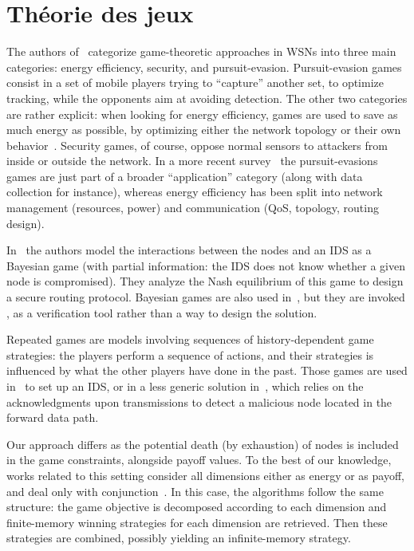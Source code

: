 \section{Théorie des jeux}

The authors of~\cite{MT08} categorize game-theoretic approaches in WSNs into three main categories: energy efficiency, security, and pursuit-evasion.
Pursuit-evasion games consist in a set of mobile players trying to “capture” another set, to optimize tracking, while the opponents aim at avoiding detection.
The other two categories are rather explicit: when looking for energy efficiency, games are used to save as much energy as possible, by optimizing either the network topology or their own behavior~\cite{CPF09}.
Security games, of course, oppose normal sensors to attackers from inside or outside the network.
In a more recent survey~\cite{SWKC12} the pursuit-evasions games are just part of a broader “application” category (along with data collection for instance), whereas energy efficiency has been split into network management (resources, power) and communication (QoS, topology, routing design).

In~\cite{MMZ09} the authors model the interactions between the nodes and an IDS as a Bayesian game (\ie with partial information: the IDS does not know \apriori whether a given node is compromised).
They analyze the Nash equilibrium of this game to design a secure routing protocol.
Bayesian games are also used in~\cite{Ham12}, but they are invoked \aposteriori, as a verification tool rather than a way to design the solution.

Repeated games are models involving sequences of history-dependent game strategies: the players perform a sequence of actions, and their strategies is influenced by what the other players have done in the past.
Those games are used in~\cite{AD07} to set up an IDS, or in a less generic solution in~\cite{Red09}, which relies on the acknowledgments upon transmissions to detect a malicious node located in the forward data path.

Our approach differs as the potential death (by exhaustion) of nodes is included in the game constraints, alongside payoff values.
To the best of our knowledge, works related to this setting consider all dimensions either as energy or as payoff, and deal only with conjunction~\cite{chatterjee12,velner12a}.
In this case, the algorithms follow the same structure: the game objective is decomposed according to each dimension and finite-memory winning strategies for each dimension are retrieved.
Then these strategies are combined, possibly yielding an infinite-memory strategy.

